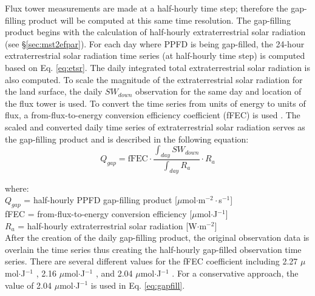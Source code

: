 Flux tower measurements are made at a half-hourly time step; therefore the gap-filling product will be computed at this same time resolution.  
The gap-filling product begins with the calculation of half-hourly extraterrestrial solar radiation (see \S \ref{sec:mst2efpar}).  
For each day where PPFD is being gap-filled, the 24-hour extraterrestrial solar radiation time series (at half-hourly time step) is computed based on Eq. \ref{eq:etsr}. 
The daily integrated total extraterrestrial solar radiation is also computed.  
To scale the magnitude of the extraterrestrial solar radiation for the land surface, the daily $SW_{down}$ observation for the same day and location of the flux tower is used.  
To convert the time series from units of energy to units of flux, a from-flux-to-energy conversion efficiency coefficient (fFEC) is used \parencite{ge11}. 
The scaled and converted daily time series of extraterrestrial solar radiation serves as the gap-filling product and is described in the following equation:
%
\begin{equation}
\label{eq:gapfill}
    Q_{gap} = \text{fFEC} \cdot 
              \frac{\int_{day} SW_{down}}{\int_{day} R_a} \cdot R_a
\end{equation}

\noindent where:\\
\indent $Q_{gap}$ = half-hourly PPFD gap-filling product [$\mu$mol$\cdot$m$^{-2}\cdot$s$^{-1}$]\\ 
\indent fFEC = from-flux-to-energy conversion efficiency [$\mu$mol$\cdot$J$^{-1}$]\\
\indent $R_a$ = half-hourly extraterrestrial solar radiation [W$\cdot$m$^{-2}$]\\

\noindent After the creation of the daily gap-filling product, the original observation data is overlain the time series thus creating the half-hourly gap-filled observation time series.  
There are several different values for the fFEC coefficient including 2.27 $\mu$mol$\cdot$J$^{-1}$ \parencite{prentice93}, 2.16 $\mu$mol$\cdot$J$^{-1}$ \parencite{ge11}, and 2.04 $\mu$mol$\cdot$J$^{-1}$ \parencite{meek84}. 
For a conservative approach, the value of 2.04 $\mu$mol$\cdot$J$^{-1}$ is used in Eq. \ref{eq:gapfill}.

